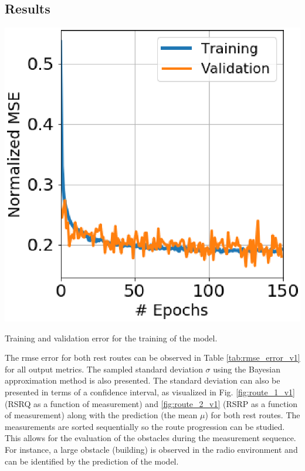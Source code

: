 \subsection{Results}
\begin{marginfigure}
    \centering
    \includegraphics{chapters/part_pathloss/drive_test_minimzation_paper/training_val_test_5ab7fb562d60543b24f857af.eps}
    \caption{Training and validation error for the training of the model.}
    \label{fig:training_val_error}
\end{marginfigure}

The \gls{rmse} error for both rest routes can be observed in Table \ref{tab:rmse_error_v1} for all output metrics. The sampled standard deviation $\sigma$ using the Bayesian approximation method is also presented. The standard deviation can also be presented in terms of a confidence interval, as visualized in Fig. \ref{fig:route_1_v1} (RSRQ as a function of measurement) and \ref{fig:route_2_v1} (RSRP as a function of measurement) along with the prediction (the mean $\mu$) for both rest routes. The measurements are sorted sequentially so the route progression can be studied. This allows for the evaluation of the obstacles during the measurement sequence. For instance, a large obstacle (building) is observed in the radio environment and can be identified by the prediction of the model. 


